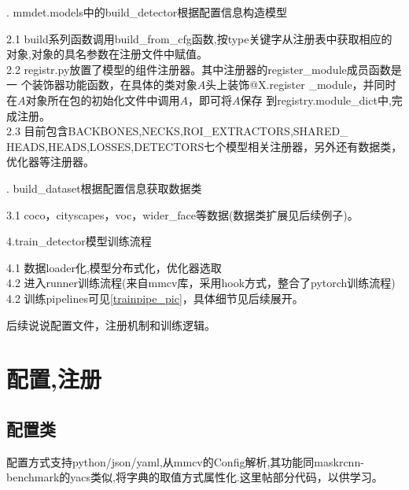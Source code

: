 \documentclass[UTF8]{ctexart}
\begin{document}
 . mmdet.models中的build\_detector根据配置信息构造模型
 \begin{adjustwidth}{0.5cm}{0cm}
 2.1 build系列函数调用build\_from\_cfg函数,按type关键字从注册表中获取相应的
 对象,对象的具名参数在注册文件中赋值。\\
2.2 registr.py放置了模型的组件注册器。其中注册器的register\_module成员函数是一
 个装饰器功能函数，在具体的类对象$A$头上装饰@X.register
 \_module，并同时在$A$对象所在包的初始化文件中调用$A$，即可将$A$保存
 到registry.module\_dict中,完成注册。\\
 2.3 目前包含BACKBONES,NECKS,ROI\_EXTRACTORS,SHARED\_
 HEADS,HEADS,LOSSES,DETECTORS七个模型相关注册器，另外还有数据类，优化器等注册器。\\
 \end{adjustwidth}
 
. build\_dataset根据配置信息获取数据类
\begin{adjustwidth}{0.5cm}{0cm} 
 3.1 coco，cityscapes，voc，wider\_face等数据(数据类扩展见后续例子)。\\
\end{adjustwidth}
 
 \noindent 4.train\_detector模型训练流程
 \begin{adjustwidth}{0.5cm}{0cm} 
 4.1 数据loader化,模型分布式化，优化器选取\\
 4.2 进入runner训练流程(来自mmcv库，采用hook方式，整合了pytorch训练流程)\\
4.2 训练pipelines可见\ref{trainpipe_pic}，具体细节见后续展开。\\
\end{adjustwidth}

\noindent 后续说说配置文件，注册机制和训练逻辑。


\section{配置,注册}
\subsection{配置类}
配置方式支持python/json/yaml,从mmcv的Config解析,其功能同maskrcnn-benchmark的yacs类似,将字典的取值方式属性化.这里帖部分代码，以供学习。
\end{document}
